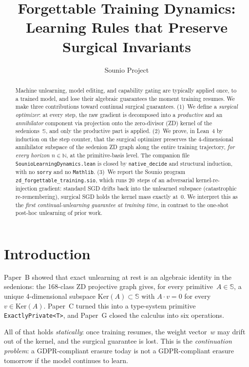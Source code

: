 \documentclass{article}
\title{Forgettable Training Dynamics:\\
       Learning Rules that Preserve Surgical Invariants}
\author{Sounio Project}
\begin{document}
\maketitle

\begin{abstract}
Machine unlearning, model editing, and capability gating are typically
applied once, to a trained model, and lose their algebraic guarantees
the moment training resumes.  We make three contributions toward
continual surgical guarantees.  (1)~We define a \emph{surgical
optimizer}: at every step, the raw gradient is decomposed into a
\emph{productive} and an \emph{annihilator} component via projection
onto the zero-divisor (ZD) kernel of the sedenions~$\mathbb S$, and
only the productive part is applied.  (2)~We prove, in Lean~4 by
induction on the step counter, that the surgical optimizer preserves
the 4-dimensional annihilator subspace of the sedenion ZD graph
along the entire training trajectory, \emph{for every horizon
$n \in \mathbb N$}, at the primitive-basis level.  The companion
file \texttt{SounioLearningDynamics.lean} is closed by
\texttt{native\_decide} and structural induction, with no
\texttt{sorry} and no \texttt{Mathlib}.  (3)~We report the Sounio
program \texttt{zd\_forgettable\_training.sio}, which runs 20~steps
of an adversarial kernel-re-injection gradient: standard SGD drifts
back into the unlearned subspace (catastrophic re-remembering),
surgical SGD holds the kernel mass exactly at~0.  We interpret this
as the \emph{first continual-unlearning guarantee at training time},
in contrast to the one-shot post-hoc unlearning of prior work.
\end{abstract}

\section{Introduction}

Paper~B showed that exact unlearning at rest is an algebraic
identity in the sedenions: the 168-class ZD projective graph gives,
for every primitive~$A \in \mathbb S$, a unique 4-dimensional
subspace $\mathrm{Ker}(A) \subset \mathbb S$ with $A \cdot v = 0$
for every $v \in \mathrm{Ker}(A)$.  Paper~C turned this into a
type-system primitive \texttt{ExactlyPrivate<T>}, and Paper~G closed
the calculus into six operations.

All of that holds \emph{statically}: once training resumes, the
weight vector~$w$ may drift out of the kernel, and the surgical
guarantee is lost.  This is the \emph{continuation problem}: a
GDPR-compliant erasure today is not a GDPR-compliant erasure
tomorrow if the model continues to learn.
\end{document}
